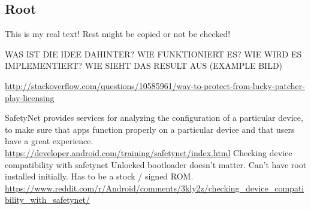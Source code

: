 \subsection{Root} \label{subsection:counter-tampering-root}
This is my real text! Rest might be copied or not be checked!



WAS IST DIE IDEE DAHINTER? WIE FUNKTIONIERT ES? WIE WIRD ES IMPLEMENTIERT? WIE SIEHT DAS RESULT AUS (EXAMPLE BILD)\newline

\url{http://stackoverflow.com/questions/10585961/way-to-protect-from-lucky-patcher-play-licensing}\newline






SafetyNet provides services for analyzing the configuration of a particular device, to make sure that apps function properly on a particular device and that users have a great experience. \url{https://developer.android.com/training/safetynet/index.html} Checking device compatibility with safetynet\newline
Unlocked bootloader doesn't matter.
Can't have root installed initially.
Has to be a stock / signed ROM.
\url{https://www.reddit.com/r/Android/comments/3kly2z/checking_device_compatibility_with_safetynet/}
